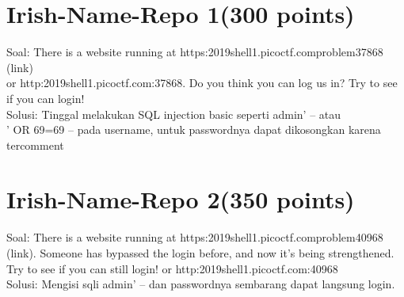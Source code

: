 \documentclass[a4paper,12pt]{article}
\begin{document}
\section{\textbf{Irish-Name-Repo 1(300 points)}}
Soal: There is a website running at https:\/\/2019shell1.picoctf.com\/problem\/37868\/ (link)\\ or http:\/\/2019shell1.picoctf.com:37868. Do you think you can log us in? Try to see if you can login!\\
Solusi: Tinggal melakukan SQL injection basic seperti admin' -- atau \\ ' OR 69=69 -- pada username, untuk passwordnya dapat dikosongkan karena tercomment
\section{\textbf{Irish-Name-Repo 2(350 points)}}
Soal: There is a website running at https:\/\/2019shell1.picoctf.com\/problem\/40968\/ (link). Someone has bypassed the login before, and now it's being strengthened. Try to see if you can still login! or http:\/\/2019shell1.picoctf.com:40968\\
Solusi: Mengisi sqli admin' -- dan passwordnya sembarang dapat langsung login.
\end{document}
